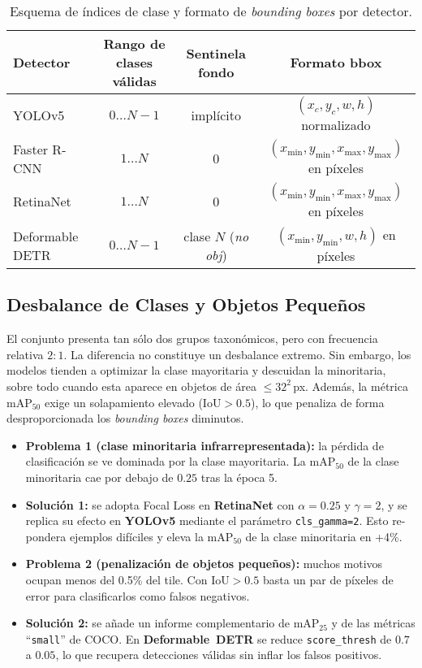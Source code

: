 \begin{table}[ht]
\centering
\caption{Esquema de índices de clase y formato de \emph{bounding boxes} por detector.}
\label{tab:label_schemes}
\begin{tabular}{|l|c|c|c|}
\hline
\textbf{Detector} & \textbf{Rango de clases válidas} & \textbf{Sentinela fondo} & \textbf{Formato bbox} \\ \hline
YOLOv5            & $0\dots N{-}1$                   & implícito                & $(x_c,y_c,w,h)$ normalizado \\ \hline
Faster R-CNN      & $1\dots N$                       & 0                        & $(x_{\min},y_{\min},x_{\max},y_{\max})$ en píxeles \\ \hline
RetinaNet         & $1\dots N$                       & 0                        & $(x_{\min},y_{\min},x_{\max},y_{\max})$ en píxeles \\ \hline
Deformable DETR   & $0\dots N{-}1$                   & clase $N$ (\textit{no obj}) & $(x_{\min},y_{\min},w,h)$ en píxeles \\ \hline
\end{tabular}
\end{table}


\subsection{Desbalance de Clases y Objetos Pequeños}\label{ssec:small_obj}

El conjunto presenta tan sólo dos grupos taxonómicos, pero con frecuencia relativa \(2{:}1\).
La diferencia no constituye un desbalance extremo.
Sin embargo, los modelos tienden a optimizar la clase mayoritaria y descuidan la minoritaria, sobre todo cuando esta aparece en objetos de área \(\le 32^2\)\,px.
Además, la métrica \(\text{mAP}_{50}\) exige un solapamiento elevado (\(\text{IoU}>0.5\)), lo que penaliza de forma desproporcionada los \emph{bounding boxes} diminutos.

\begin{itemize}
   \item \textbf{Problema 1 (clase minoritaria infrarrepresentada):} la pérdida de clasificación se ve dominada por la clase mayoritaria.
   La \(\text{mAP}_{50}\) de la clase minoritaria cae por debajo de \(0.25\) tras la época 5.
   \item \textbf{Solución 1:} se adopta Focal Loss en \textbf{RetinaNet} con \(\alpha=0.25\) y \(\gamma=2\), y se replica su efecto en \textbf{YOLOv5} mediante el parámetro \texttt{cls\_gamma=2}.
   Esto re-pondera ejemplos difíciles y eleva la \(\text{mAP}_{50}\) de la clase minoritaria en +4\%.
   \item \textbf{Problema 2 (penalización de objetos pequeños):} muchos motivos ocupan menos del 0.5\% del tile.
   Con \(\text{IoU}>0.5\) basta un par de píxeles de error para clasificarlos como falsos negativos.
   \item \textbf{Solución 2:} se añade un informe complementario de \(\text{mAP}_{25}\) y de las métricas “\texttt{small}” de COCO.
   En \textbf{Deformable~DETR} se reduce \texttt{score\_thresh} de \(0.7\) a \(0.05\), lo que recupera detecciones válidas sin inflar los falsos positivos.
\end{itemize}


